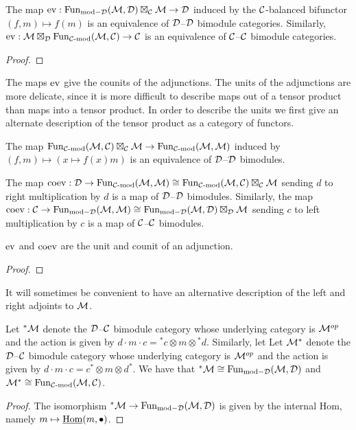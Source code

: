 \documentclass{amsart}
\begin{document}
\begin{lemma}
The map $\mathrm{ev}: \operatorname{Fun}_{\text{mod}-\mathcal D}(\mathcal M, \mathcal D) \boxtimes_{\mathcal C} \mathcal M \rightarrow \mathcal D$ induced by the $\mathcal C$-balanced bifunctor $(f,m) \mapsto f(m)$ is an equivalence of $\mathcal D$--$\mathcal D$ bimodule categories.  Similarly, $\mathrm{ev}: \mathcal M \boxtimes_{\mathcal D} \operatorname{Fun}_{\mathcal C\text{-mod}}(\mathcal M, \mathcal C) \rightarrow \mathcal C$ is an equivalence of $\mathcal C$--$\mathcal C$ bimodule categories.
\end{lemma}
\begin{proof}

\end{proof}

The maps $\mathrm{ev}$ give the counits of the adjunctions.  The units of the adjunctions are more delicate, since it is more difficult to describe maps out of a tensor product than maps into a tensor product.  In order to describe the units we first give an alternate description of the tensor product as a category of functors.


\begin{lemma}
The map $\operatorname{Fun}_{\mathcal C\text{-mod}}(\mathcal M,\mathcal C) \boxtimes_\mathcal C \mathcal M \rightarrow \operatorname{Fun}_{\mathcal C\text{-mod}}(\mathcal M,\mathcal M)$ induced by $(f,m) \mapsto (x \mapsto f(x)m)$ is an equivalence of $\mathcal D$--$\mathcal D$ bimodules.
\end{lemma}

\begin{lemma}
The map $\mathrm{coev}: \mathcal D \rightarrow \operatorname{Fun}_{\mathcal C\text{-mod}}(\mathcal M,\mathcal M) \cong \operatorname{Fun}_{\mathcal C\text{-mod}}(\mathcal M,\mathcal C) \boxtimes_\mathcal C \mathcal M$ sending $d$ to right multiplication by $d$ is a map of $\mathcal D$--$\mathcal D$ bimodules.  Similarly, the map $\mathrm{coev}: \mathcal C \rightarrow \operatorname{Fun}_{\text{mod}-\mathcal D}(\mathcal M,\mathcal M) \cong \operatorname{Fun}_{\text{mod}-\mathcal D}(\mathcal M,\mathcal D) \boxtimes_\mathcal D \mathcal M$ sending $c$ to left multiplication by $c$ is a map of $\mathcal C$--$\mathcal C$ bimodules.
\end{lemma}

\begin{theorem}
$\mathrm{ev}$ and $\mathrm{coev}$ are the unit and counit of an adjunction.
\end{theorem}
\begin{proof}

\end{proof}


It will sometimes be convenient to have an alternative description of the left and right adjoints to $\mathcal M$.

\begin{lemma}
Let ${}^*\mathcal M$ denote the $\mathcal D$--$\mathcal C$ bimodule category whose underlying category is $\mathcal M^{{op}}$ and the action is given by $d\cdot m \cdot c = {}^*c \otimes m \otimes {}^*d$.  Similarly, let Let $\mathcal M^*$ denote the $\mathcal D$--$\mathcal C$ bimodule category whose underlying category is $\mathcal M^{{op}}$ and the action is given by $d\cdot m \cdot c = c^* \otimes m \otimes d^*$.  We have that ${}^*\mathcal M \cong \operatorname{Fun}_{\text{mod}-\mathcal D}(\mathcal M, \mathcal D)$ and $\mathcal M^* \cong \operatorname{Fun}_{\mathcal C\text{-mod}}(\mathcal M, \mathcal C)$.
\end{lemma}
\begin{proof}
The isomorphism ${}^*\mathcal M \rightarrow \operatorname{Fun}_{\text{mod}-\mathcal D}(\mathcal M, \mathcal D)$ is given by the internal Hom, namely $m \mapsto \underline{\operatorname{Hom}}(m, \bullet)$.
\end{proof}
\end{document}
